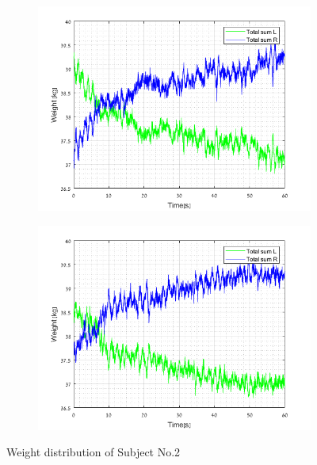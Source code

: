 \documentclass[twoside]{ctuthesis}
\theoremstyle{plain}
\theoremstyle{definition}
\theoremstyle{note}
\begin{document}
\begin{figure}[H]
	\centering
	\begin{subfigure}{\textwidth}
		\hspace*{-1cm}
		\includegraphics[scale=.9]{W_sub2_OE}
	\end{subfigure}\hfil
	\begin{subfigure}{\textwidth}
		\hspace*{-1cm}
		\includegraphics[scale=.9]{W_sub2_CE}
	\end{subfigure}
	\caption{Weight distribution of Subject No.2}
\end{figure}
\end{document}
